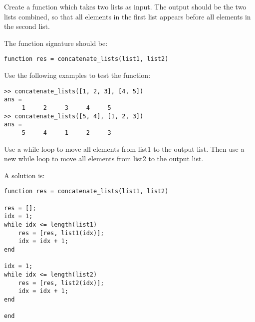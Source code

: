 \begin{ex}
Create a function which takes two lists as input.
The output should be the two lists combined, 
so that all elements in the first list appears
before all elements in the second list.

The function signature should be:
\begin{lstlisting}
function res = concatenate_lists(list1, list2)
\end{lstlisting}
Use the following examples to test the function:
\begin{lstlisting}
>> concatenate_lists([1, 2, 3], [4, 5])
ans =
     1     2     3     4     5
>> concatenate_lists([5, 4], [1, 2, 3])
ans =
     5     4     1     2     3
\end{lstlisting}
\begin{hint}
Use a while loop to move all elements from list1 
to the output list.
Then use a new while loop to move all elements from 
list2 to the output list.
\end{hint}
\begin{sol}
A solution is:
\begin{lstlisting}
function res = concatenate_lists(list1, list2)

res = [];
idx = 1;
while idx <= length(list1)
    res = [res, list1(idx)];
    idx = idx + 1;
end

idx = 1;
while idx <= length(list2)
    res = [res, list2(idx)];
    idx = idx + 1;
end

end
\end{lstlisting}
\end{sol}
\end{ex}


